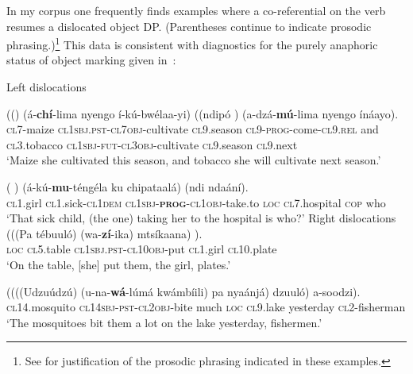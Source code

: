 \documentclass[output=paper]{LSP/langsci}
\begin{document}
In my corpus one frequently finds examples where a co-referential  on the verb resumes a dislocated object DP. 
(Parentheses continue to indicate prosodic phrasing.)\footnote{See \citet{Chengetal2016Phasal} for justification of the prosodic phrasing indicated in these examples.}
This data is consistent with  diagnostics for the purely anaphoric status of object marking given in~:

\ea Left dislocations\\
\ea\label{02-do-ex:9}

\gll (() (á-\textbf{chí}-lima nyengo í-kú-bwélaa-yi) ((ndipó ) (a-dzá-\textbf{mú}-lima nyengo ínáayo).\\
		\textsc{cl7}-maize \textsc{cl1sbj.pst}-\textsc{cl7obj}-cultivate \textsc{cl9}.season \textsc{cl9}-\textsc{prog}-come-\textsc{cl9.rel} and \textsc{cl3}.tobacco \textsc{cl1sbj}-\textsc{fut}-\textsc{cl3obj}-cultivate \textsc{cl9}.season \textsc{cl9}.next\\
\glt ‘Maize she cultivated this season, and tobacco she will cultivate next season.’
	
\ex\label{02-do-ex:10}
\gll ( 	) (á-kú-\textbf{mu}-téngéla ku chipataalá) (ndi ndaání).\\
	\textsc{cl1}.girl \textsc{cl1}.sick-\textsc{cl1dem} \textsc{cl1sbj}-\textbf{\textsc{prog}}-\textsc{cl1obj}-take.to \textsc{loc} \textsc{cl7}.hospital \textsc{cop} who\\
\glt ‘That sick child, (the one) taking her to the hospital is who?’
\z
\z
\ea\label{02-do-ex:11}
Right dislocations\\
\ea \label{02-do-ex:11a}
\gll (((Pa tébuuló) (wa-\textbf{zí}-ika) mtsíkaana) ).\\
		\textsc{loc} \textsc{cl5}.table \textsc{cl1sbj.pst}-\textsc{cl10obj}-put \textsc{cl1}.girl		 \textsc{cl10}.plate\\
\glt ‘On the table, [she] put them, the girl, plates.’

\ex
\label{02-do-ex:11b}%

\gll ((((Udzuúdzú) (u-na-\textbf{wá}-lúmá kwámbíili) 	pa nyaánjá) 	dzuuló) a-soodzi).\\
\textsc{cl14}.mosquito \textsc{cl14sbj}-\textsc{pst}-\textsc{cl2obj}-bite much \textsc{loc} \textsc{cl9}.lake yesterday \textsc{cl2}-fisherman\\
\glt ‘The mosquitoes bit them a lot on the lake yesterday, fishermen.’
\z
\z
\end{document}
